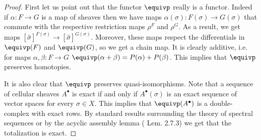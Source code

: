 \begin{proof}
First let us point out that the functor $\equivp$ really is a functor. Indeed if $\alpha:F\to G$ is a map of sheaves then we have maps $\alpha(\sigma):F(\sigma)\to G(\sigma)$ that commute with the respective restriction maps $\rho^F$ and $\rho^G$. As a result, we get maps $[\hat{\sigma}]^{F(\sigma)}\to [\hat{\sigma}]^{G(\sigma)}$. Moreover, these maps respect the differentials in $\equivp(F)$ and $\equivp(G)$, so we get a chain map. It is clearly additive, i.e. for maps $\alpha,\beta:F\to G$ $\equivp(\alpha+\beta)=P(\alpha)+P(\beta)$. This implies that $\equivp$ preserves homotopies.

It is also clear that $\equivp$ preserves quasi-isomorphisms. Note that a sequence of cellular sheaves $A^{\bullet}$ is exact if and only if $A^{\bullet}(\sigma)$ is an exact sequence of vector spaces for every $\sigma\in X$. This implies that $\equivp(A^{\bullet})$ is a double-complex with exact rows. By standard results surrounding the theory of spectral sequences or by the acyclic assembly lemma (\cite{weibel} Lem. 2.7.3) we get that the totalization is exact.


\end{proof}
